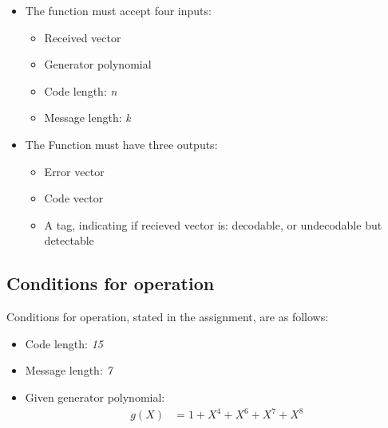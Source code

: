 \documentclass[MiniProjectMain]{subfiles}
\begin{document}
\begin{itemize}

\item 
The function must accept four inputs:

	\begin{itemize}
	\item Received vector
	\item Generator polynomial
	\item Code length: \textit{n}
	\item Message length: \textit{k}
	\end{itemize}

\newpage
\item The Function must have three outputs:

	\begin{itemize}
	\item Error vector
	\item Code vector
	\item A tag, indicating if recieved vector is:
		\subitem decodable, or
		\subitem undecodable but detectable
	\end{itemize}
	
\end{itemize}

\subsection{Conditions for operation}
Conditions for operation, stated in the assignment, are as follows:

\begin{itemize}

\item Code length: \textit{15}
\item Message length: \textit{7}
\item Given generator polynomial:
\begin{align}
g(X) &= 1 + X^4 + X^6 + X^7 + X^8
\end{align}

\end{itemize}

\newpage
\end{document}
